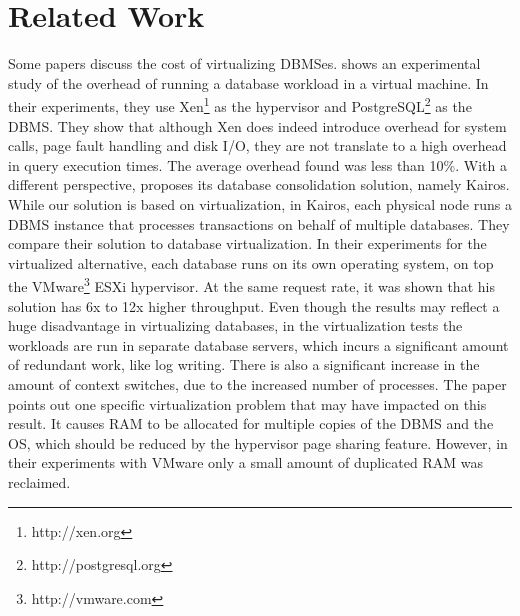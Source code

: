 \chapter{\textbf{Related Work}}

\label{Related Work}

Some papers discuss the cost of virtualizing DBMSes. \cite{4498282} shows an experimental study of the overhead of running a database workload in a virtual machine. In their experiments, they use Xen\footnote{http://xen.org} as the hypervisor and PostgreSQL\footnote{http://postgresql.org} as the DBMS. They show that although Xen does indeed introduce overhead for system calls, page fault handling and disk I/O, they are not translate to a high overhead in query execution times. The average overhead found was less than 10\%.  With a different perspective, \cite{Curino:2011:WDM:1989323.1989357} proposes its database consolidation solution, namely Kairos. While our solution is based on virtualization, in Kairos, each physical node runs a DBMS instance that processes transactions on behalf of multiple databases. They compare their solution to database virtualization. In their experiments for the virtualized alternative, each database runs on its own operating system, on top the VMware\footnote{http://vmware.com} ESXi hypervisor. At the same request rate, it was shown that his solution has 6x to 12x higher throughput. Even though the results may reflect a huge disadvantage in virtualizing databases, in the virtualization tests the workloads are run in separate database servers, which incurs a significant amount of redundant work, like log writing. There is also a significant increase in the amount of context switches, due to the increased number of processes. The paper points out one specific virtualization problem that may have impacted on this result. It causes RAM to be allocated for multiple copies of the DBMS and the OS, which should be reduced by the hypervisor page sharing feature. However, in their experiments with VMware only a small amount of duplicated RAM was reclaimed.

